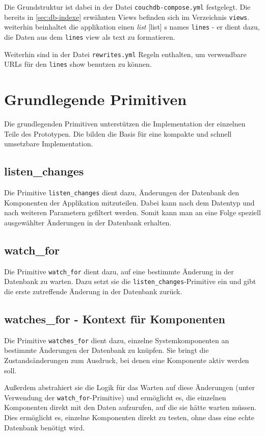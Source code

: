 Die Grundstruktur ist dabei in der Datei \verb|couchdb-compose.yml| festgelegt.
Die bereits in \cref{sec:db-indexe} erwähnten Views befinden sich im Verzeichnis \verb|views|.
weiterhin beinhaltet die applikation einen \emph{list} \cite{couchdb:guide}[list] s names \verb|lines| - er dient dazu, die Daten aus dem \verb|lines| view als text zu formatieren.

Weiterhin sind in der Datei \verb|rewrites.yml| Regeln enthalten, um verwendbare URLs für den \verb|lines| show benutzen zu können.

\section{Grundlegende Primitiven}

Die grundlegenden Primitiven unterstützen die Implementation der einzelnen Teile des Prototypen. Die bilden die Basis für eine kompakte und schnell umsetzbare Implementation.

\subsection{listen\_changes}

Die Primitive \verb|listen_changes| dient dazu,
Änderungen der Datenbank den Komponenten der Applikation mitzuteilen.
Dabei kann nach dem Datentyp und nach weiteren Parametern gefiltert werden.
Somit kann man an eine Folge speziell ausgewählter Änderungen in der Datenbank erhalten.

\subsection{watch\_for}

Die Primitive \verb|watch_for| dient dazu, auf eine bestimmte Änderung in der Datenbank zu warten. Dazu setzt sie die \verb|listen_changes|-Primitive ein und gibt die erste zutreffende Änderung in der Datenbank zurück.

\subsection{watches\_for - Kontext für Komponenten}

Die Primitive \verb|watches_for| dient dazu, einzelne Systemkomponenten
an bestimmte Änderungen der Datenbank zu knüpfen.
Sie bringt die Zustandsänderungen zum Ausdruck,
bei denen eine Komponente aktiv werden soll.

Außerdem abstrahiert sie die Logik für das Warten auf diese Änderungen
(unter Verwendung der \verb|watch_for|-Primitive)
und ermöglicht es, die einzelnen Komponenten direkt mit den Daten aufzurufen,
auf die sie hätte warten müssen.
Dies ermöglicht es, einzelne Komponenten direkt zu testen, ohne dass eine echte Datenbank benötigt wird.

